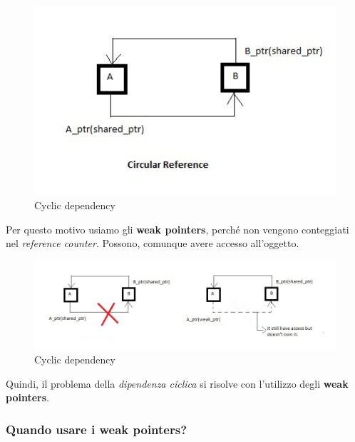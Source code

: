 \begin{figure}[H]
	\centering
	\includegraphics[width=1\textwidth, height=1\textheight, keepaspectratio]{./imgs/shared_ptr_problem_cyclic_dependency.jpg}
	\caption{Cyclic dependency}
	\label{fig:shared_ptr_problem_cyclic_dependency}
\end{figure}

\textsf{\small Per questo motivo usiamo gli \textbf{weak pointers}, perché non vengono conteggiati nel \emph{reference counter}. Possono, comunque avere accesso all'oggetto.} \\

\begin{figure}[H]
	\centering
	\includegraphics[width=1.2\textwidth, height=1.2\textheight, keepaspectratio]{./imgs/shared_ptr_problem_cyclic_dependency2.jpg}
	\caption{Cyclic dependency}
	\label{fig:shared_ptr_problem_cyclic_dependency2}
\end{figure}

\textsf{\small Quindi, il problema della \emph{dipendenza ciclica} si risolve con l'utilizzo degli \textbf{weak pointers}.} \\

\subsubsection{Quando usare i weak pointers?}

